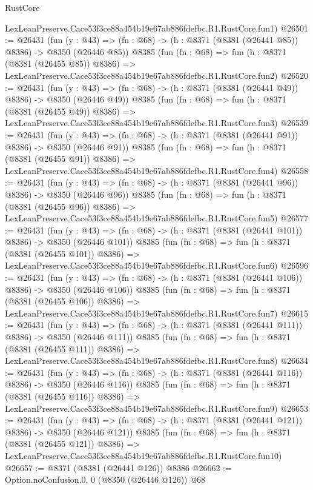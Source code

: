 \begin{lexlean}{RustCore}
\begin{coremodule}
    LexLeanPreserve.Cace53f3ce88a454b19e67ab886fdefbc.R1.RustCore.fun1)
@26501 := @26431
    (fun (y : @43) => (fn : @68) -> (h : @8371 (@8381 (@26441 @85)) @8386) -> @8350 (@26446 @85))
    @8385
    (fun (fn : @68) =>
    fun (h : @8371 (@8381 (@26455 @85)) @8386) =>
    LexLeanPreserve.Cace53f3ce88a454b19e67ab886fdefbc.R1.RustCore.fun2)
@26520 := @26431
    (fun (y : @43) => (fn : @68) -> (h : @8371 (@8381 (@26441 @49)) @8386) -> @8350 (@26446 @49))
    @8385
    (fun (fn : @68) =>
    fun (h : @8371 (@8381 (@26455 @49)) @8386) =>
    LexLeanPreserve.Cace53f3ce88a454b19e67ab886fdefbc.R1.RustCore.fun3)
@26539 := @26431
    (fun (y : @43) => (fn : @68) -> (h : @8371 (@8381 (@26441 @91)) @8386) -> @8350 (@26446 @91))
    @8385
    (fun (fn : @68) =>
    fun (h : @8371 (@8381 (@26455 @91)) @8386) =>
    LexLeanPreserve.Cace53f3ce88a454b19e67ab886fdefbc.R1.RustCore.fun4)
@26558 := @26431
    (fun (y : @43) => (fn : @68) -> (h : @8371 (@8381 (@26441 @96)) @8386) -> @8350 (@26446 @96))
    @8385
    (fun (fn : @68) =>
    fun (h : @8371 (@8381 (@26455 @96)) @8386) =>
    LexLeanPreserve.Cace53f3ce88a454b19e67ab886fdefbc.R1.RustCore.fun5)
@26577 := @26431
    (fun (y : @43) => (fn : @68) -> (h : @8371 (@8381 (@26441 @101)) @8386) -> @8350 (@26446 @101))
    @8385
    (fun (fn : @68) =>
    fun (h : @8371 (@8381 (@26455 @101)) @8386) =>
    LexLeanPreserve.Cace53f3ce88a454b19e67ab886fdefbc.R1.RustCore.fun6)
@26596 := @26431
    (fun (y : @43) => (fn : @68) -> (h : @8371 (@8381 (@26441 @106)) @8386) -> @8350 (@26446 @106))
    @8385
    (fun (fn : @68) =>
    fun (h : @8371 (@8381 (@26455 @106)) @8386) =>
    LexLeanPreserve.Cace53f3ce88a454b19e67ab886fdefbc.R1.RustCore.fun7)
@26615 := @26431
    (fun (y : @43) => (fn : @68) -> (h : @8371 (@8381 (@26441 @111)) @8386) -> @8350 (@26446 @111))
    @8385
    (fun (fn : @68) =>
    fun (h : @8371 (@8381 (@26455 @111)) @8386) =>
    LexLeanPreserve.Cace53f3ce88a454b19e67ab886fdefbc.R1.RustCore.fun8)
@26634 := @26431
    (fun (y : @43) => (fn : @68) -> (h : @8371 (@8381 (@26441 @116)) @8386) -> @8350 (@26446 @116))
    @8385
    (fun (fn : @68) =>
    fun (h : @8371 (@8381 (@26455 @116)) @8386) =>
    LexLeanPreserve.Cace53f3ce88a454b19e67ab886fdefbc.R1.RustCore.fun9)
@26653 := @26431
    (fun (y : @43) => (fn : @68) -> (h : @8371 (@8381 (@26441 @121)) @8386) -> @8350 (@26446 @121))
    @8385
    (fun (fn : @68) =>
    fun (h : @8371 (@8381 (@26455 @121)) @8386) =>
    LexLeanPreserve.Cace53f3ce88a454b19e67ab886fdefbc.R1.RustCore.fun10)
@26657 := @8371 (@8381 (@26441 @126)) @8386
@26662 := Option.noConfusion.{0, 0} (@8350 (@26446 @126)) @68

\end{coremodule}
\end{lexlean}
